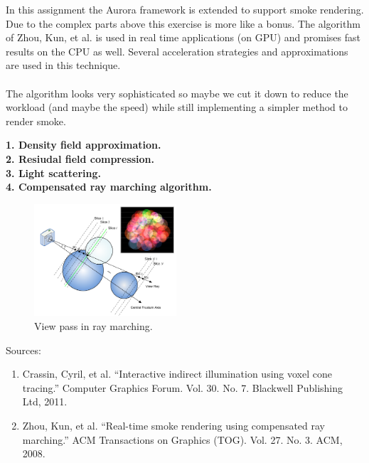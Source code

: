 \documentclass[A4paper]{gdv/gdv}
\newcommand{\teilaufgabe}[1]{\textbf{#1.}}
\begin{document}
\begin{gdvSheet}
In this assignment the Aurora framework is extended to support smoke rendering. Due to the complex parts above this exercise is more like a bonus. The algorithm of Zhou, Kun, et al. is used in real time applications (on GPU) and promises fast results on the CPU as well. Several acceleration strategies and approximations are used in this technique. \\
\\
The algorithm looks very sophisticated so maybe we cut it down to reduce the workload (and maybe the speed) while still implementing a simpler method to render smoke.

\teilaufgabe{1. Density field approximation} \\
\teilaufgabe{2. Resiudal field compression} \\
\teilaufgabe{3. Light scattering} \\
\teilaufgabe{4. Compensated ray marching algorithm} \\

\begin{figure}[h]
\centering
\includegraphics[width=200px]{img/smoke.png}
\caption{View pass in ray marching.}
\end{figure}

Sources:
\begin{enumerate}
\item Crassin, Cyril, et al. ``Interactive indirect illumination using voxel cone tracing.'' Computer Graphics Forum. Vol. 30. No. 7. Blackwell Publishing Ltd, 2011.
\item Zhou, Kun, et al. ``Real-time smoke rendering using compensated ray marching.'' ACM Transactions on Graphics (TOG). Vol. 27. No. 3. ACM, 2008.
\end{enumerate}

\vfill
% 
% 
\end{gdvSheet}
\end{document}
